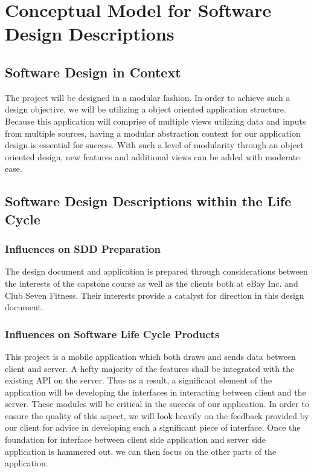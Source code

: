 \documentclass[letterpaper,10pt,titlepage]{article}
\begin{document}
\section{Conceptual Model for Software Design Descriptions}

\subsection{Software Design in Context}
The project will be designed in a modular fashion. In order to achieve such a design objective, we will be utilizing a object oriented application structure. Because this application will comprise of multiple views utilizing data and inputs from multiple sources, having a modular abstraction context for our application design is essential for success. With such a level of modularity through an object oriented design, new features and additional views can be added with moderate ease.

\subsection{Software Design Descriptions within the Life Cycle}

\subsubsection{Influences on SDD Preparation}
The design document and application is prepared through considerations between the interests of the capstone course as well as the clients both at eBay Inc. and Club Seven Fitness. Their interests provide a catalyst for direction in this design document.

\subsubsection{Influences on Software Life Cycle Products}
This project is a mobile application which both draws and sends data between client and server. A hefty majority of the features shall be integrated with the existing API on the server. Thus as a result, a significant element of the application will be developing the interfaces in interacting between client and the server. These modules will be critical in the success of our application. In order to ensure the quality of this aspect, we will look heavily on the feedback provided by our client for advice in developing such a significant piece of interface. Once the foundation for interface between client side application and server side application is hammered out, we can then focus on the other parts of the application.
\end{document}
